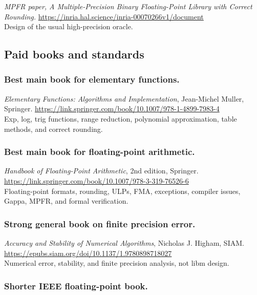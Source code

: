 \documentclass[manuscript, nonacm]{acmart}
\begin{document}
    \emph{MPFR paper, A Multiple-Precision Binary Floating-Point Library with
    Correct Rounding.}
    \url{https://inria.hal.science/inria-00070266v1/document}\\
    Design of the usual high-precision oracle.

    \subsection{Paid books and standards}

    \subsubsection{Best main book for elementary functions.}

    \emph{Elementary Functions: Algorithms and Implementation}, Jean-Michel
    Muller, Springer.
    \url{https://link.springer.com/book/10.1007/978-1-4899-7983-4}\\
    Exp, log, trig functions, range reduction, polynomial approximation, table
    methods, and correct rounding.

    \subsubsection{Best main book for floating-point arithmetic.}

    \emph{Handbook of Floating-Point Arithmetic}, 2nd edition, Springer.
    \url{https://link.springer.com/book/10.1007/978-3-319-76526-6}\\
    Floating-point formats, rounding, ULPs, FMA, exceptions, compiler issues,
    Gappa, MPFR, and formal verification.

    \subsubsection{Strong general book on finite precision error.}

    \emph{Accuracy and Stability of Numerical Algorithms}, Nicholas J. Higham,
    SIAM.
    \url{https://epubs.siam.org/doi/10.1137/1.9780898718027}\\
    Numerical error, stability, and finite precision analysis, not libm design.

    \subsubsection{Shorter IEEE floating-point book.}
\end{document}
